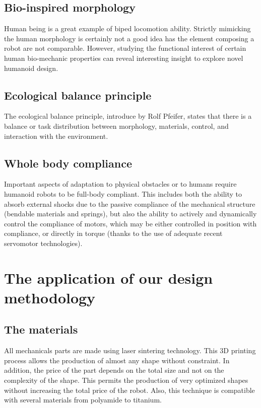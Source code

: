 \subsection{Bio-inspired morphology} %
Human being is a great example of biped locomotion ability. Strictly mimicking the human morphology is certainly not a good idea has the element composing a robot are not comparable. However, studying the functional interest of certain human bio-mechanic properties can reveal interesting insight to explore novel humanoid design.

\subsection{Ecological balance principle} %
The ecological balance principle, introduce by Rolf Pfeifer, states that there is a balance or task distribution between morphology, materials, control, and interaction with the environment.

\subsection{Whole body compliance} %
Important aspects of adaptation to physical obstacles or to humans require humanoid robots to be full-body compliant. This includes both the ability to absorb external shocks due to the passive compliance of the mechanical structure (bendable materials and springs), but also the ability to actively and dynamically control the compliance of motors, which may be either controlled in position with compliance, or directly in torque (thanks to the use of adequate recent servomotor technologies).



\section{The application of our design methodology} %

\subsection{The materials} %
All mechanicals parts are made using laser sintering technology. This 3D printing process allows the production of almost any shape without constraint. In addition, the price of the part depends on the total size and not on the complexity of the shape. This permits the production of very optimized shapes without increasing the total price of the robot. Also, this technique is compatible with several materials from polyamide to titanium. 

